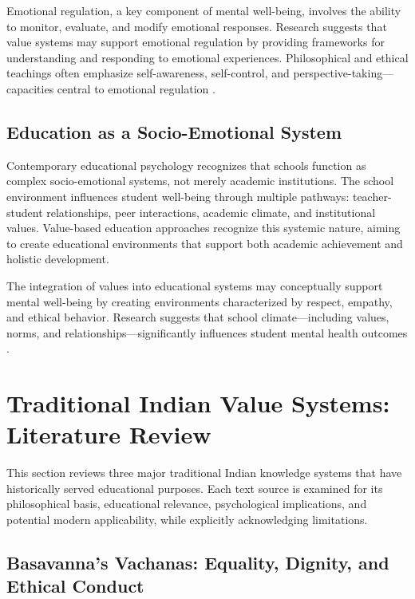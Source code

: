 \documentclass[12pt,a4paper,twocolumn]{article}
\begin{document}
Emotional regulation, a key component of mental well-being, involves the ability to monitor, evaluate, and modify emotional responses. Research suggests that value systems may support emotional regulation by providing frameworks for understanding and responding to emotional experiences. Philosophical and ethical teachings often emphasize self-awareness, self-control, and perspective-taking—capacities central to emotional regulation \citep{Kumar2018}.

\subsection{Education as a Socio-Emotional System}

Contemporary educational psychology recognizes that schools function as complex socio-emotional systems, not merely academic institutions. The school environment influences student well-being through multiple pathways: teacher-student relationships, peer interactions, academic climate, and institutional values. Value-based education approaches recognize this systemic nature, aiming to create educational environments that support both academic achievement and holistic development.

The integration of values into educational systems may conceptually support mental well-being by creating environments characterized by respect, empathy, and ethical behavior. Research suggests that school climate—including values, norms, and relationships—significantly influences student mental health outcomes \citep{Sharma2018}.

\section{Traditional Indian Value Systems: Literature Review}

This section reviews three major traditional Indian knowledge systems that have historically served educational purposes. Each text source is examined for its philosophical basis, educational relevance, psychological implications, and potential modern applicability, while explicitly acknowledging limitations.

\subsection{Basavanna's Vachanas: Equality, Dignity, and Ethical Conduct}
\end{document}

